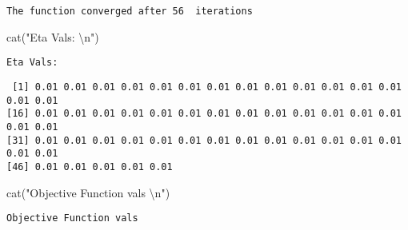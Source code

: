 \documentclass[
  letterpaper,
  DIV=11,
  numbers=noendperiod]{scrartcl}
\newenvironment{Shaded}{\begin{snugshade}}{\end{snugshade}}
\newcommand{\DecValTok}[1]{\textcolor[rgb]{0.68,0.00,0.00}{#1}}
\newcommand{\FunctionTok}[1]{\textcolor[rgb]{0.28,0.35,0.67}{#1}}
\newcommand{\NormalTok}[1]{\textcolor[rgb]{0.00,0.23,0.31}{#1}}
\newcommand{\SpecialCharTok}[1]{\textcolor[rgb]{0.37,0.37,0.37}{#1}}
\newcommand{\StringTok}[1]{\textcolor[rgb]{0.13,0.47,0.30}{#1}}
\begin{document}
\begin{Shaded}
\end{Shaded}

\begin{verbatim}
The function converged after 56  iterations 
\end{verbatim}

\begin{Shaded}
\begin{Highlighting}[]
\FunctionTok{cat}\NormalTok{(}\StringTok{"Eta Vals: }\SpecialCharTok{\textbackslash{}n}\StringTok{"}\NormalTok{)}
\end{Highlighting}
\end{Shaded}

\begin{verbatim}
Eta Vals: 
\end{verbatim}

\begin{Shaded}
\end{Shaded}

\begin{verbatim}
 [1] 0.01 0.01 0.01 0.01 0.01 0.01 0.01 0.01 0.01 0.01 0.01 0.01 0.01 0.01 0.01
[16] 0.01 0.01 0.01 0.01 0.01 0.01 0.01 0.01 0.01 0.01 0.01 0.01 0.01 0.01 0.01
[31] 0.01 0.01 0.01 0.01 0.01 0.01 0.01 0.01 0.01 0.01 0.01 0.01 0.01 0.01 0.01
[46] 0.01 0.01 0.01 0.01 0.01
\end{verbatim}

\begin{Shaded}
\begin{Highlighting}[]
\FunctionTok{cat}\NormalTok{(}\StringTok{"Objective Function vals }\SpecialCharTok{\textbackslash{}n}\StringTok{"}\NormalTok{)}
\end{Highlighting}
\end{Shaded}

\begin{verbatim}
Objective Function vals 
\end{verbatim}
\end{document}
